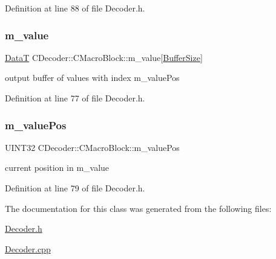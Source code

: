 Definition at line 88 of file Decoder.\+h.

\mbox{\label{classCDecoder_1_1CMacroBlock_a7722de1000647fb5a894db2e2f348bdd}} 
\subsubsection{\texorpdfstring{m\_value}{m\_value}}
{\footnotesize\ttfamily \mbox{\hyperlink{PGFtypes_8h_acb1ee3f52ccfad782dcaa0abd79e5d05}{DataT}} C\+Decoder\+::\+C\+Macro\+Block\+::m\+\_\+value\mbox{[}\mbox{\hyperlink{PGFtypes_8h_aa362edf6db9662acf6ef958a6db19c35}{Buffer\+Size}}\mbox{]}}



output buffer of values with index m\+\_\+value\+Pos 



Definition at line 77 of file Decoder.\+h.

\mbox{\label{classCDecoder_1_1CMacroBlock_a38f42e9e2d5ac8387db0122aecac79be}} 
\subsubsection{\texorpdfstring{m\_valuePos}{m\_valuePos}}
{\footnotesize\ttfamily U\+I\+N\+T32 C\+Decoder\+::\+C\+Macro\+Block\+::m\+\_\+value\+Pos}



current position in m\+\_\+value 



Definition at line 79 of file Decoder.\+h.



The documentation for this class was generated from the following files\+:\begin{DoxyCompactItemize}
\item 
\mbox{\hyperlink{Decoder_8h}{Decoder.\+h}}\item 
\mbox{\hyperlink{Decoder_8cpp}{Decoder.\+cpp}}\end{DoxyCompactItemize}
